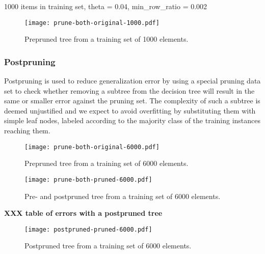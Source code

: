 \documentclass[a4paper,10pt]{article}
\newcommand{\XXX}[1]{{\bf XXX #1}}
\begin{document}
1000 items in training set, theta = 0.04, min\_row\_ratio = 0.002

\begin{figure}[h]
  \centering
  \begin{minipage}[c]{1.0\textwidth}
    \centering
\texttt{[image: prune-both-original-1000.pdf]}
  \end{minipage}
  \caption{Prepruned tree from a training set of 1000 elements.}
  \label{fig:prepruned-1000}
\end{figure}

\subsubsection{Postpruning}
\label{sect:postpruning}

Postpruning is used to reduce generalization error by using a special
pruning data set to check whether removing a subtree from the decision
tree will result in the same or smaller error against the pruning set.
The complexity of such a subtree is deemed unjustified and we expect
to avoid overfitting by substituting them with simple leaf nodes,
labeled according to the majority class of the training instances
reaching them\cite[p. 194 mun kirjassa]{alpaydin2004}.

\begin{figure}[h]
  \centering
  \begin{minipage}[c]{1.0\textwidth}
    \centering

\texttt{[image: prune-both-original-6000.pdf]}
  \end{minipage}
  \caption{Prepruned tree from a training set of 6000 elements.}
  \label{fig:prune-both-original-6000}
\end{figure}

\begin{figure}[h]
  \centering
  \begin{minipage}[c]{1.0\textwidth}
    \centering

\texttt{[image: prune-both-pruned-6000.pdf]}
  \end{minipage}
  \caption{Pre- and postpruned tree from a training set of 6000 elements.}
  \label{fig:prune-both-pruned-6000}
\end{figure}

\XXX{table of errors with a postpruned tree}
\begin{figure}[h]
  \centering
  \begin{minipage}[c]{1.0\textwidth}
    \centering
\texttt{[image: postpruned-pruned-6000.pdf]}
  \end{minipage}
  \caption{Postpruned tree from a training set of 6000 elements.}
  \label{fig:no-pruning-6000}
\end{figure}
\end{document}
